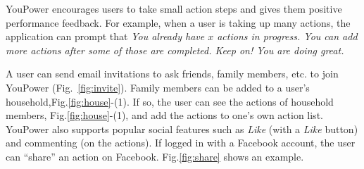 \documentclass[a4paper,10pt]{article}
\begin{document}
YouPower encourages users to take small action steps and gives them positive performance feedback. For example, when a user is taking up many actions, the application can prompt that \textit{You already have $x$ actions in progress. You can add more actions after some of those are completed. Keep on! You are doing great.} 

A user can send email invitations to ask friends, family members, etc. to join YouPower (Fig.~\ref{fig:invite}). Family members can be added to a user's household,Fig.\ref{fig:house}-(1). If so, the user can see the actions of household members, Fig.\ref{fig:house}-(1), and add the actions to one's own action list. YouPower also supports popular social features such as \textit{Like} (with a \textit{Like} button) and commenting (on the actions). If logged in with a Facebook account, the user can ``share'' an action on Facebook. Fig.\ref{fig:share} shows an example.
\end{document}
